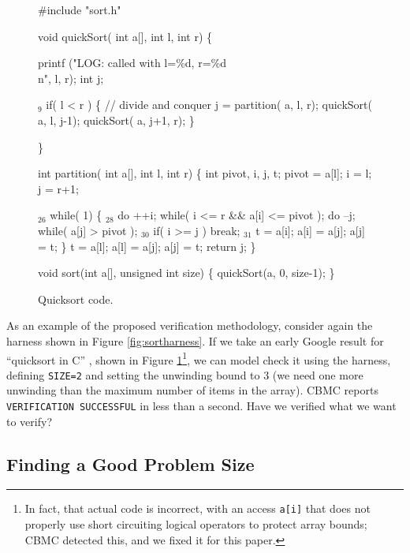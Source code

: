 \documentclass{svjour3}
\begin{document}
\begin{figure}
{%
\begin{code}
 \#include "sort.h"

 void quickSort( int a[], int l, int r)
 \{

   printf ("LOG: called with l=\%d, r=\%d\\n", l, r); 
   int j;

{$_9$}  if( l < r ) 
     \{
       // divide and conquer
       j = partition( a, l, r);
       quickSort( a, l, j-1);
       quickSort( a, j+1, r);
     \}
  
 \}

 int partition( int a[], int l, int r) \{
   int pivot, i, j, t;
   pivot = a[l];
   i = l; j = r+1;
  
{$_{26}$} while( 1)
     \{
{$_{28}$}     do ++i; while( i <= r \&\& a[i] <= pivot );
       do --j; while( a[j] > pivot );
{$_{30}$}     if( i >= j ) break;
{$_{31}$}     t = a[i]; a[i] = a[j]; a[j] = t;
     \}
   t = a[l]; a[l] = a[j]; a[j] = t;
   return j;
 \}


 void sort(int a[], unsigned int size) \{
   quickSort(a, 0, size-1);
 \}
\end{code}
}
\caption{Quicksort code.}
\label{fig:qsort}
\end{figure}

As an example of the proposed verification methodology, consider again
the harness shown in Figure \ref{fig:sortharness}.  If we take an
early Google result for ``quicksort in C'' \cite{quicksortcode},
shown in Figure \ref{fig:qsort}\footnote{In fact, that actual code is
  incorrect, with an access {\tt a[i]} that does not properly use
  short circuiting logical operators to protect array bounds; CBMC
  detected this, and we fixed it for this paper.}, we can model check
it using the harness, defining {\tt SIZE=2} and setting the unwinding
bound to 3 (we need one more unwinding than the maximum
number of items in the array).  CBMC reports {\tt VERIFICATION
  SUCCESSFUL} in less than a second.  Have we verified
what we want to verify?

\subsection{Finding a Good Problem Size}
\label{sec:unwind}
\end{document}
